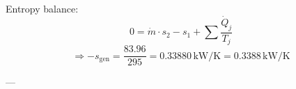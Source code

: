 Entropy balance:  
\[
0 = \dot{m} \cdot s_{2} - s_{1} + \sum \frac{\dot{Q}_{j}}{T_{j}}
\]
\[
\Rightarrow -s_{\text{gen}} = \frac{83.96}{295} = 0.33880 \, \text{kW/K} = 0.3388 \, \text{kW/K}
\]

---